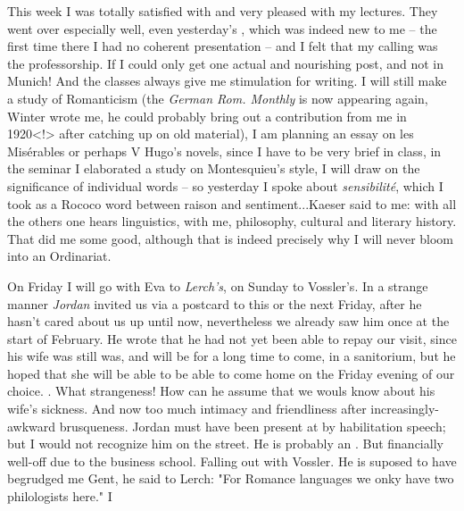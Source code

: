 This week I was totally satisfied with and very pleased with my lectures. They went over especially well, even yesterday's , which was indeed new to me -- the first time there I had no coherent presentation -- and I felt that my calling was the professorship. If I could only get one actual and nourishing post, and not in Munich! And the classes always give me stimulation for writing. I will still make a study of Romanticism (the \textit{German Rom. Monthly} is now appearing again, Winter wrote me, he could probably bring out a contribution from me in 1920<!> after catching up on old material), I am planning an essay on les Misérables or perhaps V Hugo's novels, since I have to be very brief in class, in the seminar I elaborated a study on Montesquieu's style, I will draw on the significance of individual words -- so yesterday I spoke about \textit{sensibilité}, which I took as a Rococo word between raison and sentiment...Kaeser said to me: with all the others one hears linguistics, with me, philosophy, cultural and literary history. That did me some good, although that is indeed precisely why I will never bloom into an Ordinariat.

On Friday I will go with Eva to \textit{Lerch's}, on Sunday to Vossler's. In a strange manner \textit{Jordan} invited us via a postcard to this or the next Friday, after he hasn't cared about us up until now, nevertheless we already saw him once at the start of February. He wrote that he had not yet been able to repay our visit, since his wife was still was, and will be for a long time to come, in a sanitorium, but he hoped that she will be able to be able to come home on the Friday evening of our choice. . What strangeness! How can he assume that we wouls know about his wife's sickness. And now too much intimacy and friendliness after increasingly-awkward brusqueness. Jordan must have been present at by habilitation speech; but I would not recognize him on the street. He is probably an . But financially well-off due to the business school. Falling out with Vossler. He is suposed to have begrudged me Gent, he said to Lerch: "For Romance languages we onky have two philologists here." I 

